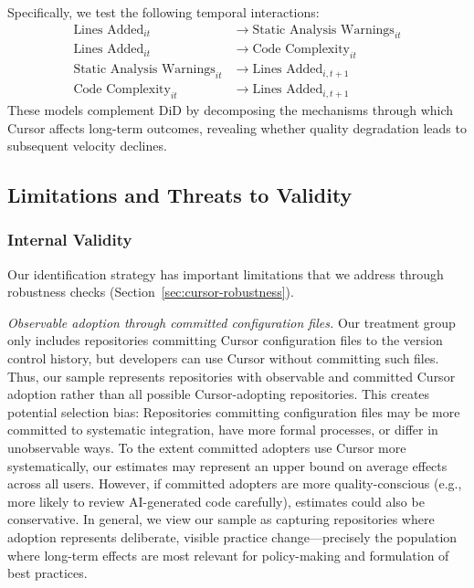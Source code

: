 Specifically, we test the following temporal interactions:
\begin{equation}
\label{eq:temporal}
\begin{aligned}
\text{Lines Added}_{it} &\to \text{Static Analysis Warnings}_{it}\\
\text{Lines Added}_{it} &\to \text{Code Complexity}_{it}\\
\text{Static Analysis Warnings}_{it} &\to \text{Lines Added}_{i,t+1}\\
\text{Code Complexity}_{it} &\to \text{Lines Added}_{i,t+1}
\end{aligned}
\end{equation}
These models complement DiD by decomposing the mechanisms through which Cursor affects long-term outcomes, revealing whether quality degradation leads to subsequent velocity declines.

\subsection{Limitations and Threats to Validity}
\label{sec:cursor-limitations}

\subsubsection{Internal Validity}
Our identification strategy has important limitations that we address through robustness checks (Section~\ref{sec:cursor-robustness}).

\emph{Observable adoption through committed configuration files.} Our treatment group only includes repositories committing Cursor configuration files to the version control history, but developers can use Cursor without committing such files.
Thus, our sample represents repositories with observable and committed Cursor adoption rather than all possible Cursor-adopting repositories. 
This creates potential selection bias: Repositories committing configuration files may be more committed to systematic integration, have more formal processes, or differ in unobservable ways. %
To the extent committed adopters use Cursor more systematically, our estimates may represent an upper bound on average effects across all users. However, if committed adopters are more quality-conscious (e.g., more likely to review AI-generated code carefully), estimates could also be conservative. 
In general, we view our sample as capturing repositories where adoption represents deliberate, visible practice change---precisely the population where long-term effects are most relevant for policy-making and formulation of best practices.

